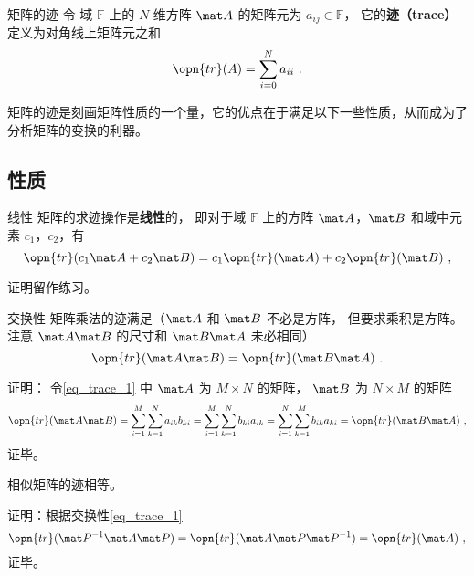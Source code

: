 


\begin{definition}{矩阵的迹}
令 域 $\mathbb{F}$ 上的 $N$ 维方阵 $\mat A$ 的矩阵元为 $a_{ij}\in\mathbb{F}$， 它的\textbf{迹（trace）}定义为对角线上矩阵元之和
\begin{equation}
\opn{tr}(A) = \sum_{i=0}^N a_{ii}~.
\end{equation}
\end{definition}

矩阵的迹是刻画矩阵性质的一个量，它的优点在于满足以下一些性质，从而成为了分析矩阵的变换的利器。


\subsection{性质}
\begin{theorem}{线性}
矩阵的求迹操作是\textbf{线性}的， 即对于域 $\mathbb{F}$ 上的方阵 $\mat A$，$\mat B$ 和域中元素 $c_1$，$c_2$，有
\begin{equation}
\opn{tr}(c_1\mat A+c_2\mat B) = c_1\opn{tr}(\mat A) + c_2\opn{tr}(\mat B)~,
\end{equation}
\end{theorem}
证明留作练习。

\begin{theorem}{交换性}\label{the_trace_1}
矩阵乘法的迹满足（$\mat A$ 和 $\mat B$ 不必是方阵， 但要求乘积是方阵。 注意 $\mat A\mat B$ 的尺寸和 $\mat B\mat A$ 未必相同）
\begin{equation}\label{eq_trace_1}
\opn{tr}(\mat A\mat B) = \opn{tr}(\mat B\mat A)~.
\end{equation}
\end{theorem}
证明： 令\autoref{eq_trace_1} 中 $\mat A$ 为 $M\times N$ 的矩阵， $\mat B$ 为 $N\times M$ 的矩阵
\begin{equation}
\opn{tr}(\mat A\mat B) = \sum_{i=1}^M \sum_{k=1}^N a_{ik}b_{ki} = \sum_{i=1}^M \sum_{k=1}^N b_{ki}a_{ik} = \sum_{i=1}^N \sum_{k=1}^M b_{ik}a_{ki} = \opn{tr}(\mat B\mat A)~,
\end{equation}
证毕。

\begin{theorem}{}
相似矩阵的迹相等。
\end{theorem}
证明：根据交换性\autoref{eq_trace_1} 
$$\opn{tr}(\mat P^{-1}\mat A\mat P) = \opn{tr}(\mat A\mat P\mat P^{-1}) = \opn{tr}(\mat A)~,$$
证毕。

